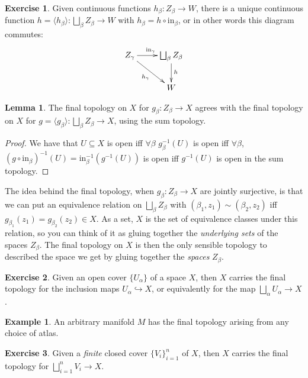 \documentclass{tufte-handout}
\def\into {\hookrightarrow}
\theoremstyle{definition}
\newtheorem{lemma}{Lemma}
\newtheorem{example}{Example}
\newtheorem{ex}{Exercise}
\begin{document}
\begin{ex} 
Given continuous functions $h_\beta\colon Z_\beta \to W$, there is a unique continuous function $h = 
\langle h_\beta \rangle \colon \bigsqcup_\beta Z_\beta\to W$ with $h_\beta = h\circ 
\mathrm{in}_\beta$, or in other words this diagram commutes: 
\[
	\xymatrix{ 
		Z_\gamma \ar[r]^{\mathrm{in}_\gamma} \ar[dr]_{h_\gamma} & \bigsqcup_\beta 
		Z_\beta \ar[d]^h \\ & W
	}
\] 
\end{ex}

\begin{lemma} 
The final topology on $X$ for $g_\beta\colon Z_\beta \to X$ agrees with the 
final topology on $X$ for $g = \langle g_\beta \rangle\colon \bigsqcup_\beta Z_\beta \to X$, 
using the sum topology. 
\end{lemma}

\begin{proof} 
We have that $U\subseteq X$ is open iff $\forall \beta$ $g_\beta^{-1}(U)$ is 
open iff $\forall \beta$, $(g\circ \mathrm{in}_\beta)^{-1}(U) = 
\mathrm{in}_\beta^{-1}\left(g^{-1}(U)\right)$ is open iff $g^{-1}(U)$ is open in the sum 
topology. 
\end{proof}

The idea behind the final topology, when $g_\beta\colon Z_\beta \to X$ are jointly 
surjective, 
is that we can put an equivalence relation on $\bigsqcup_\beta Z_\beta$ 
with $(\beta_1,z_1)\sim (\beta_2,z_2)$ iff $g_{\beta_1}(z_1) = g_{\beta_2}(z_2)\in X$. As a 
set, $X$ is the set of equivalence classes under this relation, so you can think of it as 
gluing together the \emph{underlying sets} of the spaces $Z_\beta$. The final topology on $X$ is 
then the only sensible topology to described the space we get by gluing together the 
\emph{spaces} $Z_\beta$. 

\begin{ex}
Given an open cover $\{U_\alpha\}$ of a space $X$, then $X$ carries the final topology for 
the inclusion maps $U_\alpha \into X$, or equivalently for the map 
$\bigsqcup_\alpha U_\alpha\to X$.
\end{ex}

\begin{example}
An arbitrary manifold $M$ has the final topology arising from any choice of atlas.
\end{example}

\begin{ex}\label{ex:closed_cover_gluing_lemma}
Given a \emph{finite} closed cover $\{V_i\}_{i=1}^n$ of $X$, then $X$ carries the final 
topology for $\bigsqcup_{i=1}^n V_i \to X$.
\end{ex}
\end{document}
